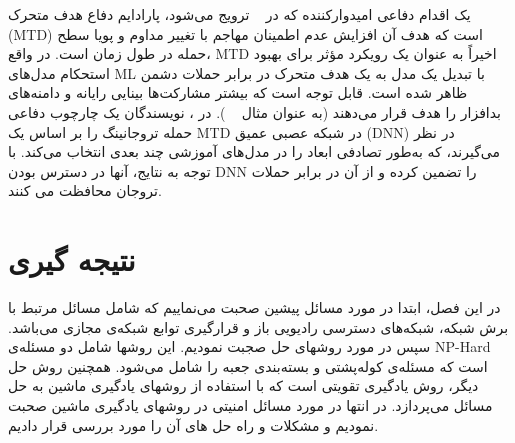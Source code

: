 یک اقدام دفاعی امیدوارکننده که در ~\cite{aisecme} ترویج می‌شود، پارادایم دفاع هدف متحرک (MTD)  است که هدف آن افزایش عدم اطمینان مهاجم با تغییر مداوم و پویا سطح حمله در طول زمان است.
در واقع، MTD اخیراً به عنوان یک رویکرد مؤثر برای بهبود استحکام مدل‌های ML با تبدیل یک مدل به یک هدف متحرک در برابر حملات دشمن ظاهر شده است. قابل توجه است که بیشتر مشارکت‌ها بینایی رایانه و دامنه‌های بدافزار را هدف قرار می‌دهند (به عنوان مثال 
 ~\cite{sengupta2019mtdeep, rashid2022mtd}
 ).
در \cite{qiu2021mt}، نویسندگان یک چارچوب دفاعی حمله تروجانینگ را بر اساس یک MTD در شبکه عصبی عمیق (DNN) در نظر می‌گیرند، که به‌طور تصادفی ابعاد را در مدل‌های آموزشی چند بعدی انتخاب می‌کند. با توجه به نتایج، آنها در دسترس بودن DNN را تضمین کرده و از آن در برابر حملات تروجان محافظت می کنند.
 \section{نتیجه گیری}
 در این فصل، ابتدا در مورد مسائل پیشین صحبت می‌نماییم که شامل مسائل مرتبط با برش شبکه، شبکه‌های دسترسی رادیویی باز و قرارگیری توابع شبکه‌ی مجازی می‌باشد. سپس در مورد روشهای حل صجبت نمودیم. این روشها شامل دو مسئله‌ی NP-Hard است که مسئله‌ی کوله‌پشتی و بسته‌بندی جعبه را شامل می‌شود. همچنین روش حل دیگر، روش یادگیری تقویتی است که با استفاده از روشهای یادگیری ماشین به حل مسائل می‌پردازد. در انتها در مورد مسائل امنیتی در روشهای یادگیری ماشین صحبت نمودیم و مشکلات و راه حل های آن را مورد بررسی قرار دادیم.